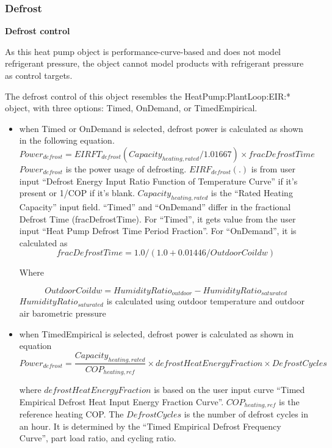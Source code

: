 \subsubsection{Defrost}

\noindent\textbf{Defrost control}

As this heat pump object is performance-curve-based and does not model
refrigerant pressure, the object cannot model products with refrigerant pressure
as control targets.

The defrost control of this object resembles the HeatPump:PlantLoop:EIR:*
object, with three options: Timed, OnDemand, or TimedEmpirical.
\begin{itemize}
  \item
when Timed or OnDemand is selected, defrost power is calculated as shown in
the following equation.
\begin{equation}
Power_{defrost} = EIRFT_{defrost}(Capacity_{heating,rated}/1.01667) \times fracDefrostTime
\end{equation}
$Power_{defrost}$ is the power usage of defrosting.
$EIRF_{defrost}(.)$ is from user input ``Defrost Energy Input Ratio Function of
Temperature Curve'' if it's present or 1/COP if it's blank. $Capacity_{heating,rated}$
is the ``Rated Heating Capacity'' input field. ``Timed'' and ``OnDemand'' differ in
the fractional Defrost Time (fracDefrostTime). For ``Timed'', it gets value from
the user input ``Heat Pump Defrost Time Period Fraction''. For ``OnDemand'', it is
calculated as
\begin{equation}
fracDefrostTime =1.0 / (1.0 + 0.01446 / OutdoorCoildw)
\end{equation}

Where

\begin{equation}
OutdoorCoildw=HumidityRatio_{outdoor}-HumidityRatio_{saturated}
\end{equation}
$HumidityRatio_{saturated}$ is calculated using outdoor temperature and outdoor air barometric pressure

\item when TimedEmpirical is selected, defrost power is calculated as shown in equation
\begin{equation}
Power_{defrost}=\frac{Capacity_{heating,rated}}{COP_{heating,ref}} \times
defrostHeatEnergyFraction \times DefrostCycles
\end{equation}

where $defrostHeatEnergyFraction$ is based on the user input curve ``Timed Empirical Defrost Heat Input Energy Fraction Curve''.
$COP_{heating,ref}$ is the reference heating COP. The $DefrostCycles$ is the number of defrost cycles in an hour.
It is determined by the ``Timed Empirical Defrost Frequency Curve'', part load ratio, and cycling ratio.

\end{itemize}


